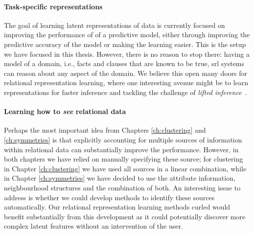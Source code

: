 \paragraph{Task-specific representations}
The goal of learning latent representations of data is currently focused on improving the performance of of a predictive model, either through improving the predictive accuracy of the model or making the learning easier.
This is the setup we have focused in this thesis.
However, there is no reason to stop there: having a model of a domain, i.e., facts and clauses that are known to be true, \gls{srl} systems can reason about any aspect of the domain.
We believe this open many doors for relational representation learning, where one interesting avenue might be to learn representations for faster inference and tackling the challenge of \textit{lifted inference}~\cite{VdBThesis13,Poole:2003:FPI:1630659.1630801}.


\paragraph{Learning how to \textit{see} relational data}
Perhaps the most important idea from Chapters \ref{ch:clustering} and \ref{ch:symmetries} is that explicitly accounting for multiple sources of information within relational data can substantially improve the performance.
However, in both chapters we have relied on manually specifying these source; for clustering in Chapter \ref{ch:clustering} we have used all sources in a linear combination, while in Chapter \ref{ch:symmetries} we have decided to use the attribute information, neighbourhood structures and the combination of both.
An interesting issue to address is whether we could develop methods to identify these sources automatically.
Our relational representation learning methods \gls{curled} would benefit substantially from this development as it could potentially discover more complex latent features without an intervention of the user.







\cleardoublepage

